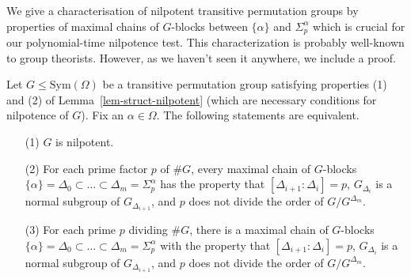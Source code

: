 \documentclass{llncs}
\newcommand{\Sym}[1]{{\ensuremath{\mathrm{Sym}\left(#1\right)}}}
\begin{document}
We give a characterisation of nilpotent transitive permutation groups
by properties of maximal chains of $G$-blocks between $\{ \alpha \}$
and $\Sigma_p^\alpha$ which is crucial for our polynomial-time
nilpotence test. This characterization is probably well-known to group
theorists. However, as we haven't seen it anywhere, we include a
proof.

\begin{theorem}\label{thm-nilpotent-main-theorem}
  Let $G\leq\Sym{\Omega}$ be a transitive permutation group satisfying
  properties (1) and (2) of Lemma~\ref{lem-struct-nilpotent} (which
  are necessary conditions for nilpotence of $G$). Fix an
  $\alpha\in\Omega$. The following statements are equivalent.
  \begin{enumerate}
  \item[(1)] $G$ is nilpotent.
  \item[(2)] For each prime factor $p$ of $\# G$, every maximal chain
    of $G$-blocks $\{ \alpha \} = \Delta_0 \subset \ldots \subset
    \Delta_m = \Sigma_p^\alpha$ has the property that
    $[\Delta_{i+1}:\Delta_i] = p$, $G_{\Delta_i}$ is a normal subgroup
    of $G_{\Delta_{i+1}}$, and $p$ does not divide the order of
    $G/G^{\Delta_m}$.
  \item[(3)] For each prime $p$ dividing $\# G$, there is a maximal
    chain of $G$-blocks $\{ \alpha \} = \Delta_0 \subset \ldots
    \subset \Delta_m = \Sigma_p^\alpha$ with the property that
    $[\Delta_{i+1}:\Delta_i] = p$, $G_{\Delta_i}$ is a normal subgroup
    of $G_{\Delta_{i+1}}$, and $p$ does not divide the order of
    $G/G^{\Delta_m}$.
  \end{enumerate}
\end{theorem}
\end{document}
